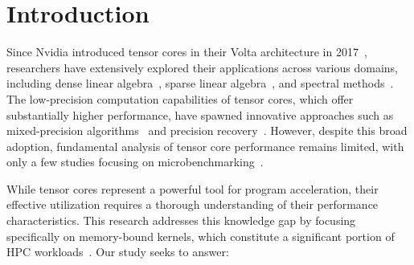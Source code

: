 \section{Introduction}
Since Nvidia introduced tensor cores in their Volta architecture in 2017~\cite{8344474}, researchers have extensively explored their applications across various domains, including dense linear algebra~\cite{bhaskaracharya2020automatickernelgenerationvolta}, sparse linear algebra~\cite{10.1145/3620666.3651378,okanovic2024high}, and spectral methods~\cite{9563043,9460474}. The low-precision computation capabilities of tensor cores, which offer substantially higher performance, have spawned innovative approaches such as mixed-precision algorithms~\cite{haidar2018harnessing,lu2024amgt} and precision recovery~\cite{10.1145/3650200.3656634,ootomo2022recovering,ootomo2024dgemm}. However, despite this broad adoption, fundamental analysis of tensor core performance remains limited, with only a few studies focusing on microbenchmarking~\cite{9931992,10579250,9926299}.


While tensor cores represent a powerful tool for program acceleration, their effective utilization requires a thorough understanding of their performance characteristics. This research addresses this knowledge gap by focusing specifically on memory-bound kernels, which constitute a significant portion of HPC workloads~\cite{austinsystem}. Our study seeks to answer: %


